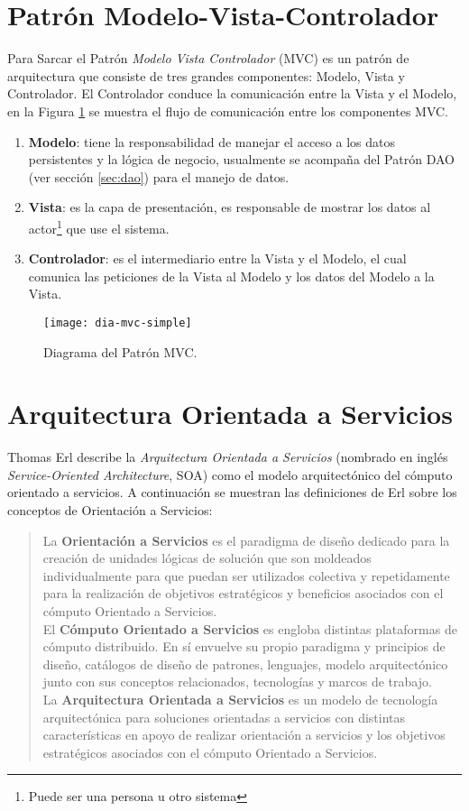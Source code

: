 \section{Patrón Modelo-Vista-Controlador}\label{sec:mvc}
Para Sarcar\cite{JavaDesignPatternsExamples} el Patrón \textit{Modelo Vista Controlador} (MVC) es un patrón de arquitectura que consiste de tres grandes componentes: Modelo, Vista y Controlador. El Controlador conduce la comunicación entre la Vista y el Modelo, en la Figura \ref{fig:dia-mvc-simple} se muestra el flujo de comunicación entre los componentes MVC.
\begin{enumerate}
	\item \textbf{Modelo}: tiene la responsabilidad de manejar el acceso a los datos persistentes y la lógica de negocio, usualmente se acompaña del Patrón DAO (ver sección \ref{sec:dao}) para el manejo de datos.
	\item \textbf{Vista}: es la capa de presentación, es responsable de mostrar los datos al actor\footnote{Puede ser una persona u otro sistema} que use el sistema.
	\item \textbf{Controlador}: es el intermediario entre la Vista y el Modelo, el cual comunica las peticiones de la Vista al Modelo y los datos del Modelo a la Vista.
\end{enumerate}
\begin{figure}[h]
  \centering
  \texttt{[image: dia-mvc-simple]}
  \caption{Diagrama del Patrón MVC\cite{JavaDesignPatternsExamples}.}
  \label{fig:dia-mvc-simple}
\end{figure}

\section{Arquitectura Orientada a Servicios}\label{sec:soa}
Thomas Erl describe la \textit{Arquitectura Orientada a Servicios} (nombrado en inglés \textit{Service-Oriented Architecture}, SOA) como el modelo arquitectónico del cómputo orientado a servicios\cite{SOAWithRest}. A continuación se muestran las definiciones de Erl\cite{SOAWithRest} sobre los conceptos de Orientación a Servicios:
\begin{quote}
La \textbf{Orientación a Servicios} es el paradigma de diseño dedicado para la creación de unidades lógicas de solución que son moldeados individualmente para que puedan ser utilizados colectiva y repetidamente para la realización de objetivos estratégicos y beneficios asociados con el cómputo Orientado a Servicios.\\
El \textbf{Cómputo Orientado a Servicios} es engloba distintas plataformas de cómputo distribuido. En sí envuelve su propio paradigma y principios de diseño, catálogos de diseño de patrones, lenguajes, modelo arquitectónico junto con sus conceptos relacionados, tecnologías y marcos de trabajo.\\
La \textbf{Arquitectura Orientada a Servicios} es un modelo de tecnología arquitectónica para soluciones orientadas a servicios con distintas características en apoyo de realizar orientación a servicios y los objetivos estratégicos asociados con el cómputo Orientado a Servicios.
\end{quote}
